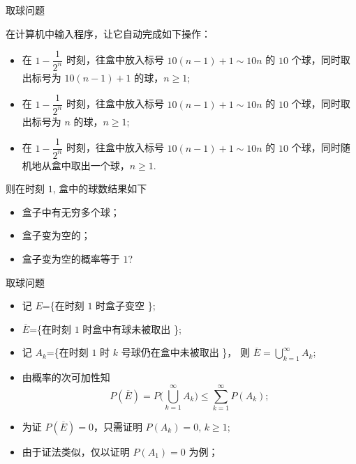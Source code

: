 \documentclass[Prob-All.tex]{subfiles}
\begin{document}
\begin{frame}{取球问题}
	\begin{exam}
		在计算机中输入程序，让它自动完成如下操作：
		\begin{itemize}[<+-|alert@+>]
			\item 在 $1-\dfrac{1}{2^n}$ 时刻，往盒中放入标号 $10 (n-1)+1\sim 10n$ 的 $10$ 个球，同时取出标号为 $10 (n-1)+1$ 的球，$n\geq 1$;
			\item 在 $1-\dfrac{1}{2^n}$ 时刻，往盒中放入标号 $10 (n-1)+1\sim 10n$ 的 $10$ 个球，同时取出标号为 $n$ 的球，$n\geq 1$;
			\item 在 $1-\dfrac{1}{2^n}$ 时刻，往盒中放入标号 $10 (n-1)+1\sim 10n$ 的 $10$ 个球，同时随机地从盒中取出一个球，$n\geq 1$.
		\end{itemize}
	\pause
		则在时刻 $1$, 盒中的球数结果如下
		\begin{itemize}[<+-|alert@+>]
			\item 盒子中有无穷多个球；
			\item 盒子变为空的；
			\item 盒子变为空的概率等于 $1$?
		\end{itemize}
	\end{exam}
\end{frame}

\begin{frame}{取球问题}
	\jieda\
	\begin{itemize}[<+-|alert@+>]
		\item 记 $E$=\{在时刻 $1$ 时盒子变空 \};
		\item $\overline{E}$=\{在时刻 $1$ 时盒中有球未被取出 \};
		\item 记 $A_k$=\{在时刻 $1$ 时 $k$ 号球仍在盒中未被取出 \}， 则 \pause$\overline{E}=\bigcup\limits_{k=1}^{\infty} A_k$;\pause
		\item 由概率的次可加性知
		$$ P( \overline{E})= P\big(\bigcup_{k=1}^{\infty}A_k\big)\leq\sum_{k=1}^{\infty} P(A_k);$$
		\item 为证 $ P (\overline{E})=0$，只需证明 $P (A_k)=0,\,k\geq 1$;
		\item 由于证法类似，仅以证明 $ P (A_1)=0$ 为例；
	\end{itemize} %


\end{frame}
\end{document}
